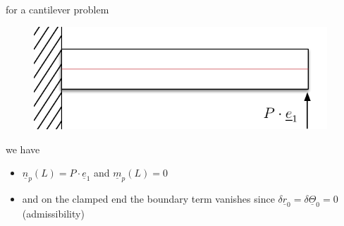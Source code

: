 \begin{frame}
  \begin{multicols}{2}
    \noindent
    for a cantilever problem
    \begin{figure}
      \centering
      \includegraphics[width=11cm, keepaspectratio=true]{sections/cosserat_rods/images/SimpleCanitleverExample}
    \end{figure}
    
    we have
    \begin{itemize}
      \item $\underline{n}_p(L) = P \cdot \underline{e}_1$ and $\underline{m}_p(L) = 0$
      \item and on the clamped end the boundary term vanishes since $\delta \underline{r}_0 = \delta \underline{\Theta}_0 = 0$ (admissibility)
    \end{itemize} 
  \end{multicols}
  
\end{frame}



